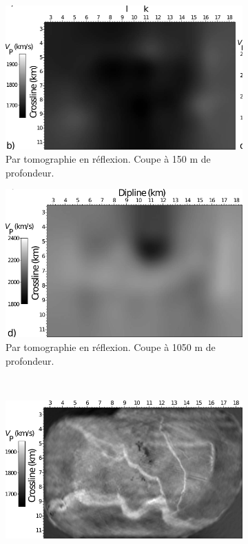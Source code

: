 \begin{figure}[!h]
    \centering
    \begin{subfigure}[b]{0.4\textwidth}
        \includegraphics[width=\textwidth]{img/geophy1.png}
        \caption{Par tomographie en réflexion. Coupe à 150 m de profondeur.}
        \label{}
    \end{subfigure}
    \hspace{0.5cm}
    \begin{subfigure}[b]{0.4\textwidth}
        \includegraphics[width=\textwidth]{img/geophy2.png}
        \caption{Par tomographie en réflexion. Coupe à 1050 m de profondeur.}
        \label{}
    \end{subfigure}\\[0.5cm]
    \begin{subfigure}[b]{0.4\textwidth}
        \includegraphics[width=\textwidth]{img/geophy3.png}

\end{subfigure}
\end{figure}
